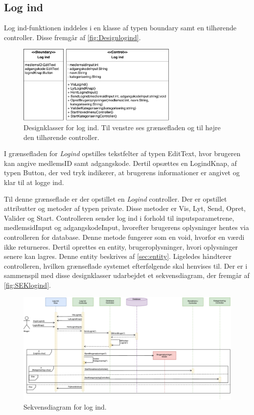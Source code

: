 \subsection*{Log ind}
Log ind-funktionen inddeles i en klasse af typen boundary samt en tilhørende controller. Disse fremgår af \autoref{fig:Designlogind}. 

\begin{figure} [H]
\centering
\includegraphics[width=0.7\textwidth]{figures/MVC/MVCLogInd}
\caption{Designklasser for log ind. Til venstre ses grænsefladen og til højre den tilhørende controller.}
\label{fig:Designlogind}
\end{figure}

\noindent
I grænsefladen for \textit{Logind} opstilles tekstfelter af typen EditText, hvor brugeren kan angive medlemsID samt adgangskode. Dertil opsættes en LogindKnap, af typen Button, der ved tryk indikerer, at brugerens informationer er angivet og klar til at logge ind. 

Til denne grænseflade er der opstillet en \textit{Logind} controller. Der er opstillet attributter og metoder af typen private. Disse metoder er Vis, Lyt, Send, Opret, Valider og Start. Controlleren sender log ind i forhold til inputsparametrene, medlemsidInput og adgangskodeInput, hvorefter brugerens oplysninger hentes via controlleren for database. Denne metode fungerer som en void, hvorfor en værdi ikke returneres. Dertil oprettes en entity, brugeroplysninger, hvori oplysninger senere kan lagres. Denne entity beskrives af \autoref{sec:entity}. Ligeledes håndterer controlleren, hvilken grænseflade systemet efterfølgende skal henvises til. Der er i sammenspil med disse designklasser udarbejdet et sekvensdiagram, der fremgår af \autoref{fig:SEKlogind}.


\begin{figure} [H]
\centering
\includegraphics[width=1.55\textwidth, angle=90]{figures/Sek/SEKLogInd}
\caption{Sekvensdiagram for log ind.}
\label{fig:SEKlogind}
\end{figure}


